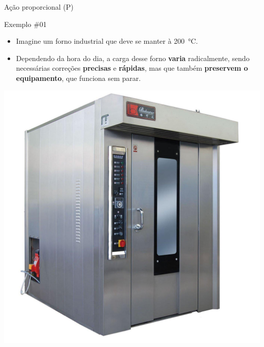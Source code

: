 \begin{frame}{Ação proporcional (P)}
	\begin{block}{Exemplo \#01}
		\begin{itemize}
			\item Imagine um forno industrial que deve se manter à \SI{200}{\degreeCelsius}.
			\item Dependendo da hora do dia, a carga desse forno \textbf{varia} radicalmente, sendo necessárias correções \textbf{precisas} e \textbf{rápidas}, mas que também \textbf{preservem o equipamento}, que funciona sem parar.
		\end{itemize}
	\end{block}

	\centering
	\includegraphics[height=0.55\textheight]{Figuras/Ch12/fig4}
\end{frame}


